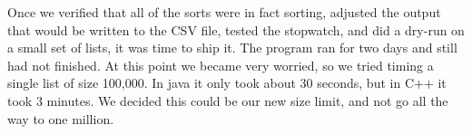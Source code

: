 Once we verified that all of the sorts were in fact sorting, adjusted the output
that would be written to the CSV file, tested the stopwatch, and did a dry-run
on a small set of lists, it was time to ship it. The program ran for two days
and still had not finished. At this point we became very worried, so we tried
timing a single list of size 100,000. In java it only took about 30 seconds, but
in C++ it took 3 minutes. We decided this could be our new size limit, and not
go all the way to one million.
